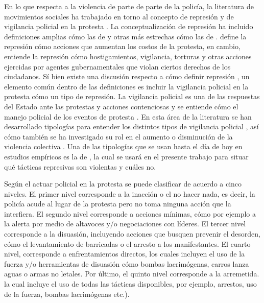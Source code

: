\documentclass[12pt,twoside]{templates/facsothesis}
\begin{document}
En lo que respecta a la violencia de parte de parte de la policía, la literatura de movimientos sociales ha trabajado en torno al concepto de represión \citep{Davenport2012, Earl2003} y de vigilancia policial en la protesta \citep{Porta1998, Porta2004, Mansley2013}. La conceptualización de represión ha incluido definiciones amplias cómo las de \citet{Tilly1978} y otras más estrechas cómo las de \citet{Davenport2007}. \citet{Tilly1978} define la represión cómo acciones que aumentan los costos de la protesta, en cambio, \citet{Davenport2007} entiende la represión cómo hostigamientos, vigilancia, torturas y otras acciones ejercidas por agentes gubernamentales que violan ciertos derechos de los ciudadanos. Sí bien existe una discusión respecto a cómo definir represión \citep{Earl2011, Davenport2012}, un elemento común dentro de las definiciones es incluir la vigilancia policial en la protesta cómo un tipo de represión. La vigilancia policial es una de las respuestas del Estado ante las protestas y acciones contenciosas y se entiende cómo el manejo policial de los eventos de protesta \citep{Porta1998}. En esta área de la literatura se han desarrollado tipologías para entender los distintos tipos de vigilancia policial \citep{Porta2004, Earl2003}, así cómo también se ha investigado su rol en el aumento o disminución de la violencia colectiva \citep{Mansley2013}. Una de las tipologías que se usan hasta el día de hoy en estudios empíricos \citep[e.g.][]{Velasquez2019} es la de \citet{Earl2003}, la cual se usará en el presente trabajo para situar qué tácticas represivas son violentas y cuáles no.

Según \citet{Earl2003} el actuar policial en la protesta se puede clasificar de acuerdo a cinco niveles. El primer nivel corresponde a la inacción o el no hacer nada, es decir, la policía acude al lugar de la protesta pero no toma ninguna acción que la interfiera. El segundo nivel corresponde a acciones mínimas, cómo por ejemplo a la alerta por medio de altavoces y/o negociaciones con líderes. El tercer nivel corresponde a la disuasión, incluyendo acciones que busquen prevenir el desorden, cómo el levantamiento de barricadas o el arresto a los manifestantes. El cuarto nivel, corresponde a enfrentamientos directos, los cuales incluyen el uso de la fuerza y/o herramientas de disuasión cómo bombas lacrimógenas, carros lanza aguas o armas no letales. Por último, el quinto nivel corresponde a la arremetida. la cual incluye el uso de todas las tácticas disponibles, por ejemplo, arrestos, uso de la fuerza, bombas lacrimógenas etc.).
\end{document}
